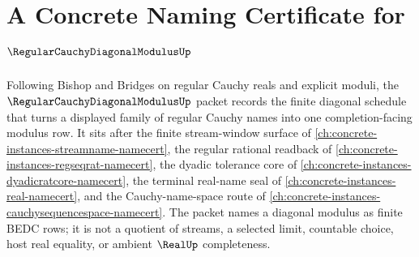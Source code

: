 \chapter{A Concrete Naming Certificate for $\RegularCauchyDiagonalModulusUp$}
\label{ch:concrete-instances-regular-cauchy-diagonal-modulus-namecert}

Following Bishop and Bridges on regular Cauchy reals and explicit moduli, the $\RegularCauchyDiagonalModulusUp$ packet records the finite diagonal schedule that turns a displayed family of regular Cauchy names into one completion-facing modulus row. It sits after the finite stream-window surface of \autoref{ch:concrete-instances-streamname-namecert}, the regular rational readback of \autoref{ch:concrete-instances-regseqrat-namecert}, the dyadic tolerance core of \autoref{ch:concrete-instances-dyadicratcore-namecert}, the terminal real-name seal of \autoref{ch:concrete-instances-real-namecert}, and the Cauchy-name-space route of \autoref{ch:concrete-instances-cauchysequencespace-namecert}. The packet names a diagonal modulus as finite BEDC rows; it is not a quotient of streams, a selected limit, countable choice, host real equality, or ambient $\RealUp$ completeness.

